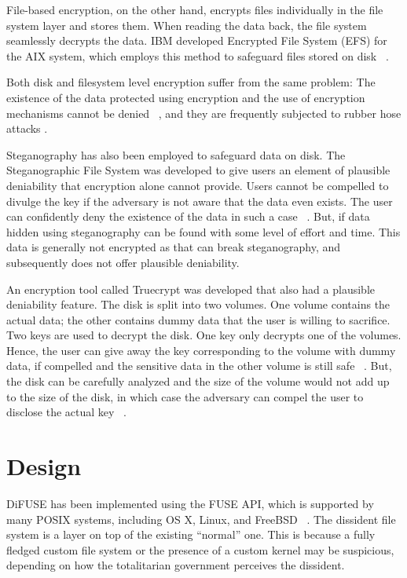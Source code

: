 \documentclass[10pt,twocolumn]{article}
\begin{document}
File-based encryption, on the other hand, encrypts files individually in the file system layer and stores them. When reading the data back, the file system seamlessly decrypts the data. IBM developed Encrypted File System (EFS) for the AIX system, which employs this method to safeguard files stored on disk ~\cite{ibmefs}.

Both disk and filesystem level encryption suffer from the same problem: The existence of the data protected using encryption and the use of encryption mechanisms cannot be denied ~\cite{gametheory}, and they are frequently subjected to rubber hose attacks \cite{rubberhose}.

Steganography has also been employed to safeguard data on disk. The Steganographic File System was developed to give users an element of plausible deniability that encryption alone cannot provide. Users cannot be compelled to divulge the key if the adversary is not aware that the data even exists. The user can confidently deny the existence of the data in such a case ~\cite{stegfs}. But, if data hidden using steganography can be found with some level of effort and time. This data is generally not encrypted as that can break steganography, and subsequently does not offer plausible deniability.

An encryption tool called Truecrypt was developed that also had a plausible deniability feature. The disk is split into two volumes. One volume contains the actual data; the other contains dummy data that the user is willing to sacrifice. Two keys are used to decrypt the disk. One key only decrypts one of the volumes. Hence, the user can give away the key corresponding to the volume with dummy data, if compelled and the sensitive data in the other volume is still safe ~\cite{gametheory}. But, the disk can be carefully analyzed and the size of the volume would not add up to the size of the disk, in which case the adversary can compel the user to disclose the actual key ~\cite{truecrypt}.

\section{Design}

DiFUSE has been implemented using the FUSE API, which is supported by many POSIX systems, including OS X, Linux, and FreeBSD ~\cite{fuse}. The dissident file system is a layer on top of the existing ``normal'' one. This is because a fully fledged custom file system or the presence of a custom kernel may be suspicious, depending on how the totalitarian government perceives the dissident.
\end{document}
